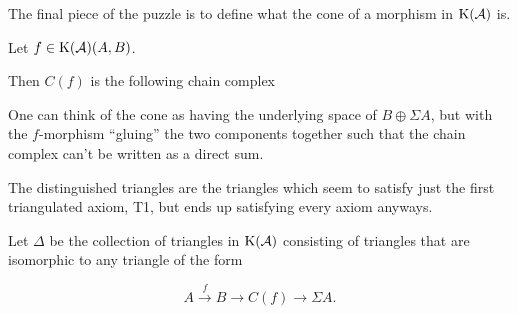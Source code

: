 The final piece of the puzzle is to define what the cone of a morphism in \( \K(\Ac) \) is.

\begin{definition}[Cone in \( \K(\Ac) \)]
    Let \( f \in \operatorname{K}({\mathcal{A}})(A, B) \).

    Then \( C(f) \) is the following chain complex
    \begin{center}
    \end{center}
\end{definition}

One can think of the cone as having the underlying space of \( B \oplus \Sigma A \), but with the \( f \)-morphism ``gluing'' the two components together such that the chain complex can't be written as a direct sum.

The distinguished triangles are the triangles which seem to satisfy just the first triangulated axiom, T1, but ends up satisfying every axiom anyways.

\begin{definition}
    \label{def:chain_homotopy_dist}
    Let \( \Delta \) be the collection of triangles in \( \K(\Ac) \) consisting of triangles that are isomorphic to any triangle of the form

    \[
        A \stackrel{f}{\to} B \to C(f) \to \Sigma A.
    \]
\end{definition}


